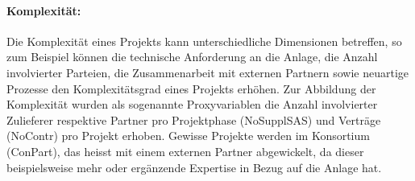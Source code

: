 \paragraph{Komplexität:} Die Komplexität eines Projekts kann unterschiedliche Dimensionen betreffen, so zum Beispiel können die technische Anforderung an die Anlage, die Anzahl involvierter Parteien, die Zusammenarbeit mit externen Partnern sowie neuartige Prozesse den Komplexitätsgrad eines Projekts erhöhen. Zur Abbildung der Komplexität wurden als sogenannte Proxyvariablen die Anzahl involvierter Zulieferer respektive Partner pro Projektphase (NoSupplSAS) und Verträge (NoContr) pro Projekt erhoben. Gewisse Projekte werden im Konsortium (ConPart), das heisst mit einem externen Partner abgewickelt, da dieser beispielsweise mehr oder ergänzende Expertise in Bezug auf die Anlage hat.


